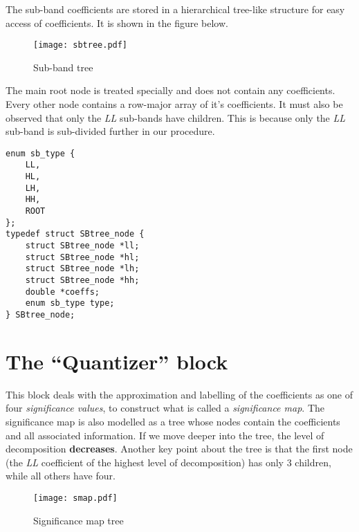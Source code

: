 \documentclass[./A14_Report.tex]{subfiles}
\begin{document}
\pagebreak

The sub-band coefficients are stored in a hierarchical tree-like structure for
easy access of coefficients. It is shown in the figure below.

\begin{figure}[H]
    \centering
    \texttt{[image: sbtree.pdf]}
    \caption{Sub-band tree \cite{libezw}}
    \label{fig:sbtreediag}
\end{figure}

The main root node is treated specially and does not contain any coefficients.
Every other node contains a row-major array of it's coefficients. It must also
be observed that only the \textit{LL} sub-bands have children. This is because
only the \textit{LL} sub-band is sub-divided further in our procedure.
\begin{code}
\begin{verbatim}
enum sb_type {
    LL,
    HL,
    LH,
    HH,
    ROOT
};
typedef struct SBtree_node {
    struct SBtree_node *ll;
    struct SBtree_node *hl;
    struct SBtree_node *lh;
    struct SBtree_node *hh;
    double *coeffs;
    enum sb_type type;
} SBtree_node;
\end{verbatim}
\caption{\texttt{C struct} representation of the tree shown in figure \ref{fig:sbtreediag} \cite{libezw}}
    \label{code:sbtreedef}
\end{code}

\section{The ``Quantizer'' block}
This block deals with the approximation and labelling of the coefficients as
one of four \textit{significance values}, to construct what is called a
\textit{significance map}. The significance map is also modelled as a tree
whose nodes contain the coefficients and all associated information. If we move
deeper into the tree, the level of decomposition \textbf{decreases}. Another
key point about the tree is that the first node (the \textit{LL} coefficient of
the highest level of decomposition) has only 3 children, while all others have
four. %

\begin{figure}[H]
    \centering
    \texttt{[image: smap.pdf]}
    \caption{Significance map tree \cite{libezw}}
    \label{fig:smaptreediag}
\end{figure}
\end{document}
